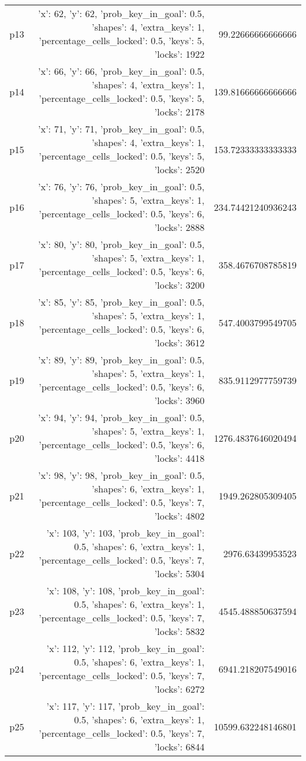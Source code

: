 \documentclass{article}
\begin{document}
\begin{center}
\begin{tabular}{r|r|r}
  p13&{'x': 62, 'y': 62, 'prob\_key\_in\_goal': 0.5, 'shapes': 4, 'extra\_keys': 1, 'percentage\_cells\_locked': 0.5, 'keys': 5, 'locks': 1922}&99.22666666666666\\
  p14&{'x': 66, 'y': 66, 'prob\_key\_in\_goal': 0.5, 'shapes': 4, 'extra\_keys': 1, 'percentage\_cells\_locked': 0.5, 'keys': 5, 'locks': 2178}&139.81666666666666\\
  p15&{'x': 71, 'y': 71, 'prob\_key\_in\_goal': 0.5, 'shapes': 4, 'extra\_keys': 1, 'percentage\_cells\_locked': 0.5, 'keys': 5, 'locks': 2520}&153.72333333333333\\
  p16&{'x': 76, 'y': 76, 'prob\_key\_in\_goal': 0.5, 'shapes': 5, 'extra\_keys': 1, 'percentage\_cells\_locked': 0.5, 'keys': 6, 'locks': 2888}&234.74421240936243\\
  p17&{'x': 80, 'y': 80, 'prob\_key\_in\_goal': 0.5, 'shapes': 5, 'extra\_keys': 1, 'percentage\_cells\_locked': 0.5, 'keys': 6, 'locks': 3200}&358.4676708785819\\
  p18&{'x': 85, 'y': 85, 'prob\_key\_in\_goal': 0.5, 'shapes': 5, 'extra\_keys': 1, 'percentage\_cells\_locked': 0.5, 'keys': 6, 'locks': 3612}&547.4003799549705\\
  p19&{'x': 89, 'y': 89, 'prob\_key\_in\_goal': 0.5, 'shapes': 5, 'extra\_keys': 1, 'percentage\_cells\_locked': 0.5, 'keys': 6, 'locks': 3960}&835.9112977759739\\
  p20&{'x': 94, 'y': 94, 'prob\_key\_in\_goal': 0.5, 'shapes': 5, 'extra\_keys': 1, 'percentage\_cells\_locked': 0.5, 'keys': 6, 'locks': 4418}&1276.4837646020494\\
  p21&{'x': 98, 'y': 98, 'prob\_key\_in\_goal': 0.5, 'shapes': 6, 'extra\_keys': 1, 'percentage\_cells\_locked': 0.5, 'keys': 7, 'locks': 4802}&1949.262805309405\\
  p22&{'x': 103, 'y': 103, 'prob\_key\_in\_goal': 0.5, 'shapes': 6, 'extra\_keys': 1, 'percentage\_cells\_locked': 0.5, 'keys': 7, 'locks': 5304}&2976.63439953523\\
  p23&{'x': 108, 'y': 108, 'prob\_key\_in\_goal': 0.5, 'shapes': 6, 'extra\_keys': 1, 'percentage\_cells\_locked': 0.5, 'keys': 7, 'locks': 5832}&4545.488850637594\\
  p24&{'x': 112, 'y': 112, 'prob\_key\_in\_goal': 0.5, 'shapes': 6, 'extra\_keys': 1, 'percentage\_cells\_locked': 0.5, 'keys': 7, 'locks': 6272}&6941.218207549016\\
  p25&{'x': 117, 'y': 117, 'prob\_key\_in\_goal': 0.5, 'shapes': 6, 'extra\_keys': 1, 'percentage\_cells\_locked': 0.5, 'keys': 7, 'locks': 6844}&10599.632248146801\\

\end{tabular}
\end{center}
\end{document}
